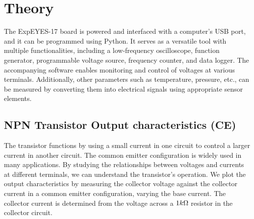 \section{Theory}
The ExpEYES-17 board is powered and interfaced with a computer's USB port, and it can be programmed using Python. It serves as a versatile tool with multiple functionalities, including a low-frequency oscilloscope, function generator, programmable voltage source, frequency counter, and data logger. The accompanying software enables monitoring and control of voltages at various terminals. Additionally, other parameters such as temperature, pressure, etc., can be measured by converting them into electrical signals using appropriate sensor elements.

\subsection{NPN Transistor Output characteristics (CE)}

    The transistor functions by using a small current in one circuit to control a larger current in another circuit. The common emitter configuration is widely used in many applications. By studying the relationships between voltages and currents at different terminals, we can understand the transistor's operation. We plot the output characteristics by measuring the collector voltage against the collector current in a common emitter configuration, varying the base current. The collector current is determined from the voltage across a $1k\ohm$ resistor in the collector circuit.

